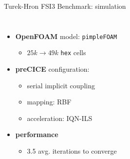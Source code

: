 \documentclass[10pt,t]{beamer}
\begin{document}
\begin{frame}{Turek-Hron FSI3 Benchmark: simulation}
\begin{columns}
\begin{itemize}
    \item \textbf{OpenFOAM} model: \texttt{pimpleFOAM}
    \begin{itemize}
        \item $25k \to 49k$ \texttt{hex} cells
    \end{itemize}
    \item \textbf{preCICE} configuration:
    \begin{itemize}
        \item serial implicit coupling
        \item mapping: RBF
        \item acceleration: IQN-ILS
    \end{itemize}
    \item \textbf{performance}
    \begin{itemize}
        \item 3.5 avg. iterations to converge
    \end{itemize}
\end{itemize}

\end{columns}

\end{frame}
\end{document}
